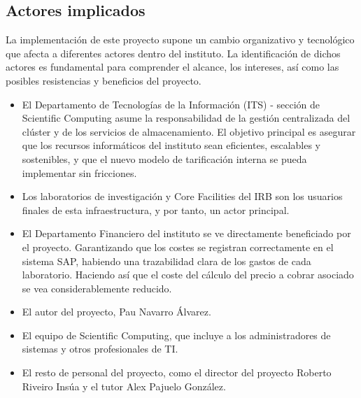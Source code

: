 \subsection{Actores implicados}
La implementación de este proyecto supone un cambio organizativo y tecnológico que afecta a diferentes 
actores dentro del instituto. La identificación de dichos actores es fundamental para comprender el alcance, 
los intereses, así como las posibles resistencias y beneficios del proyecto.
\begin{itemize}
    \item El Departamento de Tecnologías de la Información (ITS) - sección de Scientific Computing asume la responsabilidad 
    de la gestión centralizada del clúster y de los servicios de almacenamiento. El objetivo principal es asegurar que los 
    recursos informáticos del instituto sean eficientes, escalables y sostenibles, y que el nuevo modelo de tarificación interna 
    se pueda implementar sin fricciones. 
    \item Los laboratorios de investigación y Core Facilities del IRB son los usuarios finales de esta infraestructura, 
    y por tanto, un actor principal.
    \item El Departamento Financiero del instituto se ve directamente beneficiado por el proyecto. Garantizando que los costes se 
    registran correctamente en el sistema SAP, habiendo una trazabilidad clara de los gastos de cada laboratorio. Haciendo así 
    que el coste del  cálculo del precio a cobrar asociado se vea considerablemente reducido.
    \item El autor del proyecto, Pau Navarro Álvarez.
    \item El equipo de Scientific Computing, que incluye a los administradores de sistemas y otros profesionales de TI.
    \item El resto de personal del proyecto, como el director del proyecto Roberto Riveiro Insúa y el tutor Alex Pajuelo González.
\end{itemize}